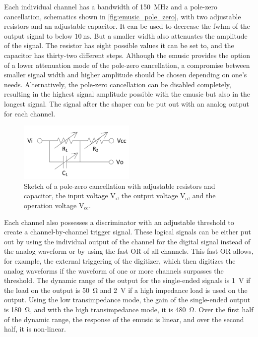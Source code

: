 Each individual channel has a bandwidth of \SI{150}{\mega\hertz} and a pole-zero cancellation, schematics shown in \autoref{fig:emusic_pole_zero}, with two adjustable resistors and an adjustable capacitor.
It can be used to decrease the \ac{fwhm} of the output signal to below $\SI{10}{\nano\second}$.
But a smaller width also attenuates the amplitude of the signal.
The resistor has eight possible values it can be set to, and the capacitor has thirty-two different steps.
Although the \ac{emusic} provides the option of a lower attenuation mode of the pole-zero cancellation, a compromise between smaller signal width and higher amplitude should be chosen depending on one's needs.
Alternatively, the pole-zero cancellation can be disabled completely, resulting in the highest signal amplitude possible with the \ac{emusic} but also in the longest signal.
The signal after the shaper can be put out with an analog output for each channel.
\begin{figure}
	\centering
	\includegraphics[width=0.5\textwidth]{pictures/emusic_pole_zero.png}
	\caption[eMUSIC pole-zero cancellation]{Sketch of a pole-zero cancellation with adjustable resistors and capacitor, the input voltage $\text{V}_\text{i}$, the output voltage $\text{V}_\text{o}$, and the operation voltage $\text{V}_\text{cc}$. \cite{gomez}}
	\label{fig:emusic_pole_zero}
\end{figure}

Each channel also possesses a discriminator with an adjustable threshold to create a channel-by-channel trigger signal.
These logical signals can be either put out by using the individual output of the channel for the digital signal instead of the analog waveform or by using the fast OR of all channels.
This fast OR allows, for example, the external triggering of the digitizer, which then digitizes the analog waveforms if the waveform of one or more channels surpasses the threshold.
The dynamic range of the output for the single-ended signals is \SI{1}{\volt} if the load on the output is \SI{50}{\ohm} and \SI{2}{\volt} if a high impedance load is used on the output.
Using the low transimpedance mode, the gain of the single-ended output is \SI{180}{\ohm}, and with the high transimpedance mode, it is \SI{480}{\ohm}.
Over the first half of the dynamic range, the response of the \ac{emusic} is linear, and over the second half, it is non-linear.

